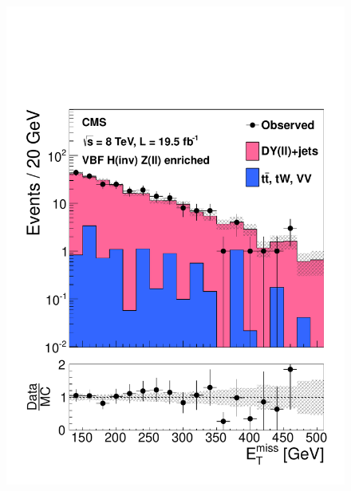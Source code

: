 \begin{figure}
  \includegraphics[width=.6\largefigwidth]{plots/prompt/VBF-ZCtrl-MET.pdf}

\end{figure}

